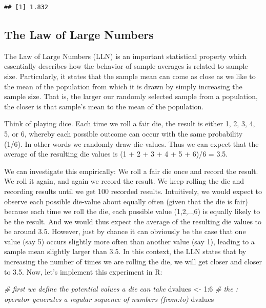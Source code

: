 \documentclass[
  12pt,
]{style/krantz}
\newenvironment{Shaded}{\begin{snugshade}}{\end{snugshade}}
\newcommand{\CommentTok}[1]{\textcolor[rgb]{0.56,0.35,0.01}{\textit{#1}}}
\newcommand{\DecValTok}[1]{\textcolor[rgb]{0.00,0.00,0.81}{#1}}
\newcommand{\NormalTok}[1]{#1}
\newcommand{\OtherTok}[1]{\textcolor[rgb]{0.56,0.35,0.01}{#1}}
\newcommand{\SpecialCharTok}[1]{\textcolor[rgb]{0.00,0.00,0.00}{#1}}
\begin{document}
\begin{verbatim}
## [1] 1.832
\end{verbatim}

\hypertarget{the-law-of-large-numbers}{%
\subsection{The Law of Large Numbers}\label{the-law-of-large-numbers}}

The Law of Large Numbers (LLN) is an important statistical property which essentially describes how the behavior of sample averages is related to sample size. Particularly, it states that the sample mean can come as close as we like to the mean of the population from which it is drawn by simply increasing the sample size. That is, the larger our randomly selected sample from a population, the closer is that sample's mean to the mean of the population.

Think of playing dice. Each time we roll a fair die, the result is either 1, 2, 3, 4, 5, or 6, whereby each possible outcome can occur with the same probability (1/6). In other words we randomly draw die-values. Thus we can expect that the average of the resulting die values is (1 + 2 + 3 + 4 + 5 + 6)/6 = 3.5.

We can investigate this empirically: We roll a fair die once and record the result. We roll it again, and again we record the result. We keep rolling the die and recording results until we get 100 recorded results. Intuitively, we would expect to observe each possible die-value about equally often (given that the die is fair) because each time we roll the die, each possible value (1,2,..,6) is equally likely to be the result. And we would thus expect the average of the resulting die values to be around 3.5. However, just by chance it can obviously be the case that one value (say 5) occurs slightly more often than another value (say 1), leading to a sample mean slightly larger than 3.5. In this context, the LLN states that by increasing the number of times we are rolling the die, we will get closer and closer to 3.5. Now, let's implement this experiment in R:

\begin{Shaded}
\begin{Highlighting}[]
\CommentTok{\# first we define the potential values a die can take}
\NormalTok{dvalues }\OtherTok{\textless{}{-}} \DecValTok{1}\SpecialCharTok{:}\DecValTok{6} \CommentTok{\# the : operator generates a regular sequence of numbers (from:to)}
\NormalTok{dvalues}
\end{Highlighting}
\end{Shaded}
\end{document}
